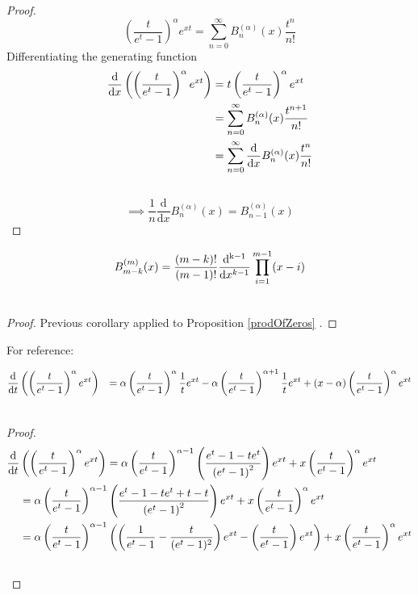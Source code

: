 \documentclass[fleqn,a4paper,9pt]{article}
\begin{document}
\begin{flushleft}
\begin{proof}
$$\left(\frac{t}{e^t-1}\right)^\alpha e^{xt}=\sum_{n=0}^\infty B_n^{(\alpha)}(x)\frac{t^n}{n!}$$
Differentiating the generating function
\begin{align}
\frac{ \mathrm{  d  }   }{\mathrm{d}x }\left(\left(\frac{t}{e^t-1}\right)^\alpha e^{xt}\right)&=t\left(\frac{t}{e^t-1}\right)^\alpha e^{xt}\\\notag
&=\sum_{n=0}^\infty B_n^{(\alpha)}(x)\frac{t^{n+1}}{n!}\\\notag
&=\sum_{n=0}^\infty \frac{ \mathrm{  d  }   }{\mathrm{d}x }B_n^{(\alpha)}(x)\frac{t^{n}}{n!}\\\notag
\end{align}
$$\implies \frac{1}{n}\frac{ \mathrm{  d  }   }{\mathrm{d}x }B_n^{(\alpha)}(x)=B_{n-1}^{(\alpha)}(x)$$
\end{proof}
\begin{corollary}\label{Dprod}
\begin{align}
B_{m-k}^{(m)}(x)&=\frac{(m-k)!}{(m-1)!}\frac{  \mathrm{  d^{k-1}  }   }{\mathrm{d}x^{k-1}  }  \prod_{i=1}^{m-1}(x-i)\\\notag
\end{align}
\end{corollary}
\begin{proof}
Previous corollary applied to Proposition \ref{prodOfZeros} .
\end{proof}
For reference:
\begin{proposition}
\begin{align}\notag
\frac{ \mathrm{  d  }   }{\mathrm{d}t }&\left(\left(\frac{t}{e^t-1}\right)^{\alpha} e^{xt}\right)
&=\alpha\left(\frac{t}{e^t-1}\right)^{\alpha}\frac{1}{t}e^{xt}-\alpha\left(\frac{t}{e^t-1}\right)^{\alpha+1}\frac{1}{t}e^{xt}  +(x-\alpha)\left(\frac{t}{e^t-1}\right)^{\alpha}e^{xt}\\\notag
\end{align}
\end{proposition}
\begin{proof}
\begin{align}\notag
\frac{ \mathrm{  d  }   }{\mathrm{d}t }&\left(\left(\frac{t}{e^t-1}\right)^{\alpha} e^{xt}\right)=\alpha\left(\frac{t}{e^t-1}\right)^{\alpha-1}\left(\frac{e^t-1-t e^t}{\left(e^t-1\right)^2}\right)e^{xt}+x\left(\frac{t}{e^t-1}\right)^{\alpha}e^{xt}\\\notag
&=\alpha\left(\frac{t}{e^t-1}\right)^{\alpha-1}\left(\frac{e^t-1-t e^t+t-t}{\left(e^t-1\right)^2}\right)e^{xt}+x\left(\frac{t}{e^t-1}\right)^{\alpha}e^{xt}\\\notag
&=\alpha\left(\frac{t}{e^t-1}\right)^{\alpha-1}\left(    \left(\frac{1}{e^t-1}-\frac{t}{(e^t-1)^2}\right)e^{xt}-\left(\frac{t}{e^t-1}\right)e^{xt}        \right) +x\left(\frac{t}{e^t-1}\right)^{\alpha}e^{xt}\\\notag

\end{align}
\end{proof}
\end{flushleft}
\end{document}
